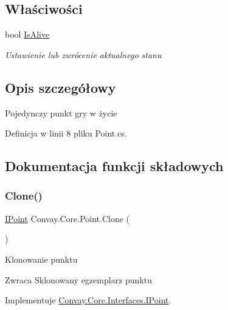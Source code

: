 \subsection*{Właściwości}
\begin{DoxyCompactItemize}
\item 
bool \hyperlink{class_convay_1_1_core_1_1_point_a03a544f933a7f068f635b7a33d790caa}{Is\+Alive}
\begin{DoxyCompactList}\small\item\em Ustawienie lub zwrócenie aktualnego stanu \end{DoxyCompactList}\end{DoxyCompactItemize}


\subsection{Opis szczegółowy}
Pojedynczy punkt gry w życie 



Definicja w linii 8 pliku Point.\+cs.



\subsection{Dokumentacja funkcji składowych}
\hypertarget{class_convay_1_1_core_1_1_point_a17444c52db4dd474a88abfd2a8d57e6d}{}\label{class_convay_1_1_core_1_1_point_a17444c52db4dd474a88abfd2a8d57e6d} 
\subsubsection{\texorpdfstring{Clone()}{Clone()}}
{\footnotesize\ttfamily \hyperlink{interface_convay_1_1_core_1_1_interfaces_1_1_i_point}{I\+Point} Convay.\+Core.\+Point.\+Clone (\begin{DoxyParamCaption}{ }\end{DoxyParamCaption})}



Klonowanie punktu 

\begin{DoxyReturn}{Zwraca}
Sklonowany egzemplarz punktu
\end{DoxyReturn}


Implementuje \hyperlink{interface_convay_1_1_core_1_1_interfaces_1_1_i_point_a4747dab5c78f8a41d079c15416825fcf}{Convay.\+Core.\+Interfaces.\+I\+Point}.



